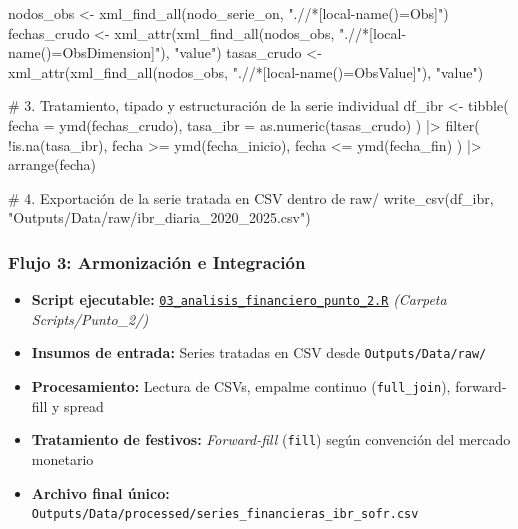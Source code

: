 \documentclass[
  10pt,
  letterpaper,
  DIV=11,
  numbers=noendperiod]{scrartcl}
\newenvironment{Shaded}{\begin{snugshade}}{\end{snugshade}}
\newcommand{\AttributeTok}[1]{\textcolor[rgb]{0.40,0.45,0.13}{#1}}
\newcommand{\CommentTok}[1]{\textcolor[rgb]{0.37,0.37,0.37}{#1}}
\newcommand{\FunctionTok}[1]{\textcolor[rgb]{0.28,0.35,0.67}{#1}}
\newcommand{\NormalTok}[1]{\textcolor[rgb]{0.00,0.23,0.31}{#1}}
\newcommand{\OtherTok}[1]{\textcolor[rgb]{0.00,0.23,0.31}{#1}}
\newcommand{\SpecialCharTok}[1]{\textcolor[rgb]{0.37,0.37,0.37}{#1}}
\newcommand{\StringTok}[1]{\textcolor[rgb]{0.13,0.47,0.30}{#1}}
\providecommand{\tightlist}{%
  \setlength{\itemsep}{0pt}\setlength{\parskip}{0pt}}
\begin{document}
\begin{Shaded}
\begin{Highlighting}[]
\NormalTok{nodos\_obs    }\OtherTok{\textless{}{-}} \FunctionTok{xml\_find\_all}\NormalTok{(nodo\_serie\_on, }\StringTok{".//*[local{-}name()=\textquotesingle{}Obs\textquotesingle{}]"}\NormalTok{)}
\NormalTok{fechas\_crudo }\OtherTok{\textless{}{-}} \FunctionTok{xml\_attr}\NormalTok{(}\FunctionTok{xml\_find\_all}\NormalTok{(nodos\_obs, }\StringTok{".//*[local{-}name()=\textquotesingle{}ObsDimension\textquotesingle{}]"}\NormalTok{), }\StringTok{"value"}\NormalTok{)}
\NormalTok{tasas\_crudo  }\OtherTok{\textless{}{-}} \FunctionTok{xml\_attr}\NormalTok{(}\FunctionTok{xml\_find\_all}\NormalTok{(nodos\_obs, }\StringTok{".//*[local{-}name()=\textquotesingle{}ObsValue\textquotesingle{}]"}\NormalTok{), }\StringTok{"value"}\NormalTok{)}

\CommentTok{\# 3. Tratamiento, tipado y estructuración de la serie individual}
\NormalTok{df\_ibr }\OtherTok{\textless{}{-}} \FunctionTok{tibble}\NormalTok{(}
  \AttributeTok{fecha    =} \FunctionTok{ymd}\NormalTok{(fechas\_crudo),}
  \AttributeTok{tasa\_ibr =} \FunctionTok{as.numeric}\NormalTok{(tasas\_crudo)}
\NormalTok{) }\SpecialCharTok{|\textgreater{}}
  \FunctionTok{filter}\NormalTok{(}
    \SpecialCharTok{!}\FunctionTok{is.na}\NormalTok{(tasa\_ibr),}
\NormalTok{    fecha }\SpecialCharTok{\textgreater{}=} \FunctionTok{ymd}\NormalTok{(fecha\_inicio),}
\NormalTok{    fecha }\SpecialCharTok{\textless{}=} \FunctionTok{ymd}\NormalTok{(fecha\_fin)}
\NormalTok{  ) }\SpecialCharTok{|\textgreater{}}
  \FunctionTok{arrange}\NormalTok{(fecha)}

\CommentTok{\# 4. Exportación de la serie tratada en CSV dentro de raw/}
\FunctionTok{write\_csv}\NormalTok{(df\_ibr, }\StringTok{"Outputs/Data/raw/ibr\_diaria\_2020\_2025.csv"}\NormalTok{)}
\end{Highlighting}
\end{Shaded}

\subsubsection{Flujo 3: Armonización e Integración}

\begin{itemize}
\tightlist
\item
  \textbf{Script ejecutable:}
  \href{https://github.com/MPalma21/Talleres_de_R/blob/main/Entregable_Talleres/Taller_3/Scripts/Punto_2/03_analisis_financiero_punto_2.R}{\texttt{03\_analisis\_financiero\_punto\_2.R}}
  \emph{(Carpeta Scripts/Punto\_2/)}
\item
  \textbf{Insumos de entrada:} Series tratadas en CSV desde
  \texttt{Outputs/Data/raw/}
\item
  \textbf{Procesamiento:} Lectura de CSVs, empalme continuo
  (\texttt{full\_join}), forward-fill y spread
\item
  \textbf{Tratamiento de festivos:} \emph{Forward-fill} (\texttt{fill})
  según convención del mercado monetario
\item
  \textbf{Archivo final único:}
  \texttt{Outputs/Data/processed/series\_financieras\_ibr\_sofr.csv}
\end{itemize}
\end{document}
